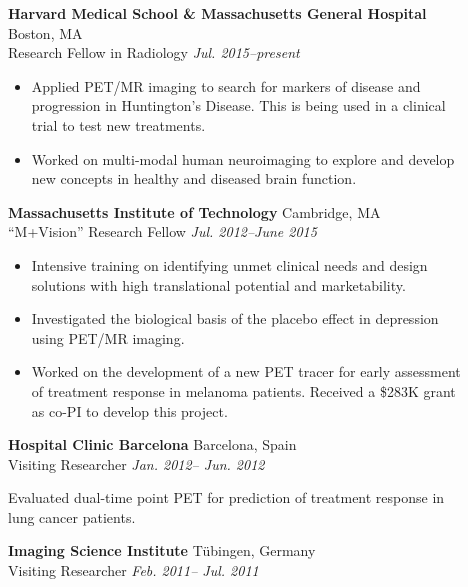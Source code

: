\documentclass[letterpaper]{article}
\begin{document}
\begin{description}

\item[] \textbf{Harvard Medical School \& Massachusetts General Hospital } \hfill Boston, MA
    \\
Research Fellow in Radiology \hfill \textit{Jul. 2015--present} 
\\
\begin{itemize}
\vspace*{-3.0ex}
 \item Applied PET/MR imaging to search for markers of disease and progression in Huntington's Disease. This is being used in a clinical trial to test new treatments.
 
 \item Worked on multi-modal human neuroimaging to explore and develop new concepts in healthy and diseased brain function.
\end{itemize}

\item[] \textbf{Massachusetts Institute of Technology} \hfill Cambridge, MA
    \\
``M+Vision'' Research Fellow \hfill \textit{Jul. 2012--June 2015} 
\\
\begin{itemize}
\vspace*{-3.0ex}
\item Intensive training on identifying unmet clinical needs and design
    solutions with high translational potential and marketability.
 \item Investigated the biological basis of the placebo effect in depression
     using PET/MR imaging.
\item Worked on the development of a new PET tracer for early assessment of treatment response in
melanoma patients. Received a \$283K grant as co-PI to develop this project. 
\end{itemize}

\item[]
    \textbf{Hospital Clinic Barcelona} \hfill Barcelona, Spain 
\\
Visiting Researcher \hfill  \textit{Jan. 2012-- Jun. 2012}

Evaluated dual-time point PET for prediction of treatment response in lung
cancer patients.

\item[]
    \textbf{Imaging Science Institute} \hfill T\"ubingen, Germany 
\\
Visiting Researcher \hfill  \textit{Feb. 2011-- Jul. 2011} 


\end{description}
\end{document}
